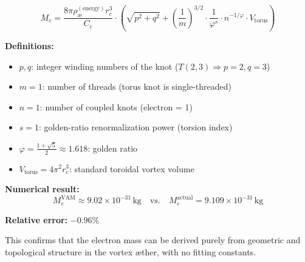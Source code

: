 \[
\boxed{
M_e = \frac{8\pi \rho_\text{\ae}^{(\text{energy})} r_c^3}{C_e} \cdot \left( \sqrt{p^2 + q^2} + \left( \frac{1}{m} \right)^{3/2} \cdot \frac{1}{\varphi^s} \cdot n^{-1/\varphi} \cdot V_{\text{torus}} \right)
}
\]

\textbf{Definitions:}
\begin{itemize}
  \item \( p, q \): integer winding numbers of the knot (\( T(2,3) \Rightarrow p = 2, q = 3 \))
  \item \( m = 1 \): number of threads (torus knot is single-threaded)
  \item \( n = 1 \): number of coupled knots (electron = 1)
  \item \( s = 1 \): golden-ratio renormalization power (torsion index)
  \item \( \varphi = \frac{1+\sqrt{5}}{2} \approx 1.618 \): golden ratio
  \item \( V_{\text{torus}} = 4\pi^2 r_c^3 \): standard toroidal vortex volume
\end{itemize}

\textbf{Numerical result:}
\[
M_e^{\text{VAM}} \approx 9.02 \times 10^{-31} \, \text{kg}
\quad \text{vs.} \quad
M_e^{\text{actual}} = 9.109 \times 10^{-31} \, \text{kg}
\]

\textbf{Relative error:} \( -0.96\% \)

This confirms that the electron mass can be derived purely from geometric and topological structure in the vortex æther, with no fitting constants.
